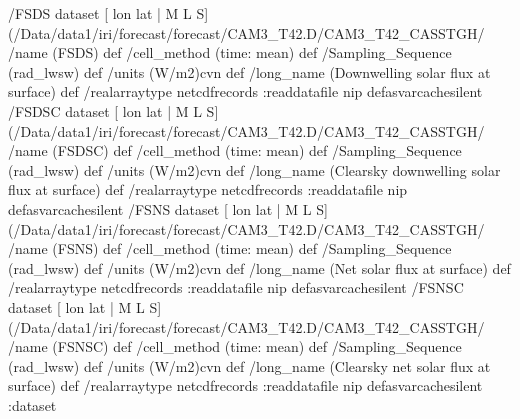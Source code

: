 \begin{ingrid}
 /FSDS{
dataset
[ lon lat | M L S] (/Data/data1/iri/forecast/forecast/CAM3_T42.D/CAM3_T42_CASSTGH/%
/name (FSDS) def
 /cell_method (time: mean) def
 /Sampling_Sequence (rad_lwsw) def
 /units (W/m2)cvn def
 /long_name (Downwelling solar flux at surface) def
 /realarraytype netcdfrecords :readdatafile
nip
}defasvarcachesilent
 /FSDSC{
dataset
[ lon lat | M L S] (/Data/data1/iri/forecast/forecast/CAM3_T42.D/CAM3_T42_CASSTGH/%
/name (FSDSC) def
 /cell_method (time: mean) def
 /Sampling_Sequence (rad_lwsw) def
 /units (W/m2)cvn def
 /long_name (Clearsky downwelling solar flux at surface) def
 /realarraytype netcdfrecords :readdatafile
nip
}defasvarcachesilent
 /FSNS{
dataset
[ lon lat | M L S] (/Data/data1/iri/forecast/forecast/CAM3_T42.D/CAM3_T42_CASSTGH/%
/name (FSNS) def
 /cell_method (time: mean) def
 /Sampling_Sequence (rad_lwsw) def
 /units (W/m2)cvn def
 /long_name (Net solar flux at surface) def
 /realarraytype netcdfrecords :readdatafile
nip
}defasvarcachesilent
 /FSNSC{
dataset
[ lon lat | M L S] (/Data/data1/iri/forecast/forecast/CAM3_T42.D/CAM3_T42_CASSTGH/%
/name (FSNSC) def
 /cell_method (time: mean) def
 /Sampling_Sequence (rad_lwsw) def
 /units (W/m2)cvn def
 /long_name (Clearsky net solar flux at surface) def
 /realarraytype netcdfrecords :readdatafile
nip
}defasvarcachesilent
:dataset


\end{ingrid}
